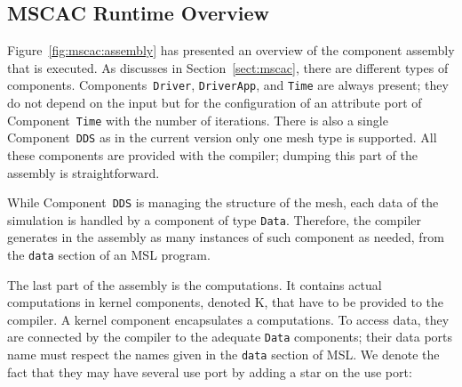 
\subsection{MSCAC Runtime Overview}

Figure~\ref{fig:mscac:assembly} has presented an overview of the component
assembly that is executed. As discusses in Section~\ref{sect:mscac},
there are different types of components. Components~\texttt{Driver},
\texttt{DriverApp}, and \texttt{Time} are always present; they do not
depend on the input but for the configuration of an attribute port of
Component~\texttt{Time} with the number of iterations. There is also a
single Component~\texttt{DDS} as in the current version only one mesh
type is supported. All these components are provided with the
compiler; dumping this part of the assembly is straightforward.

While Component~\texttt{DDS} is managing the structure of the mesh,
each data of the simulation is handled by a component of type
\texttt{Data}. Therefore, the compiler generates in the assembly as
many instances of such component as needed, from the \texttt{data}
section of an MSL program.

The last part of the assembly is the computations. It contains actual
computations in kernel components, denoted K, that have to be provided
to the compiler. A kernel component encapsulates a computations. To
access data, they are connected by the compiler to the adequate
\texttt{Data} components; their data ports name must respect the names
given in the \texttt{data} section of MSL. We denote the fact that they may have
several use port by adding a star on the use port:
\begin{center}
\end{center}
  
